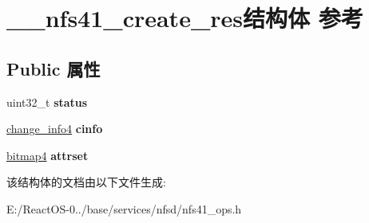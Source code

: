 \hypertarget{struct____nfs41__create__res}{}\section{\+\_\+\+\_\+nfs41\+\_\+create\+\_\+res结构体 参考}
\label{struct____nfs41__create__res}
\subsection*{Public 属性}
\begin{DoxyCompactItemize}
\item 
\mbox{\label{struct____nfs41__create__res_aa0b6ef847307f14697f06e0ec44d52f9}} 
uint32\+\_\+t {\bfseries status}
\item 
\mbox{\label{struct____nfs41__create__res_a5aa4af41644ddef6c83d1febf40e3f4c}} 
\hyperlink{struct____change__info4}{change\+\_\+info4} {\bfseries cinfo}
\item 
\mbox{\label{struct____nfs41__create__res_a741932fcd799aca07d33dd1f6acedc4d}} 
\hyperlink{struct____bitmap4}{bitmap4} {\bfseries attrset}
\end{DoxyCompactItemize}


该结构体的文档由以下文件生成\+:\begin{DoxyCompactItemize}
\item 
E\+:/\+React\+O\+S-\/0../base/services/nfsd/nfs41\+\_\+ops.\+h\end{DoxyCompactItemize}

